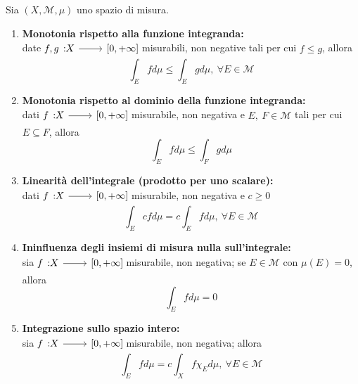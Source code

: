 \begin{property}
	Sia $\left(X,\mathcal{M},\mu\right)$ uno spazio di misura.
	\begin{enumerate}
		\item \textbf{Monotonia rispetto alla funzione integranda:}\\
		date $\funz{f,g}{X}{\left[0,+\infty\right]}$ misurabili, non negative tali per cui $f\leq g$, allora
		\begin{equation}
			\int_E fd\mu\leq \int_E gd\mu,\ \forall E\in\mathcal{M}
		\end{equation}
		\item \textbf{Monotonia rispetto al dominio della funzione integranda:}\\
		dati $\funz{f}{X}{\left[0,+\infty\right]}$ misurabile, non negativa e $E,\ F\in\mathcal{M}$ tali per cui $E\subseteq F$, allora
		\begin{equation}
			\int_Efd\mu\leq \int_Fgd\mu
		\end{equation}
		\item \textbf{Linearità dell'integrale (prodotto per uno scalare):}\\
		dati $\funz{f}{X}{\left[0,+\infty\right]}$ misurabile, non negativa e $c\geq 0$
		\begin{equation}
			\int_E cfd\mu=c\int_Efd\mu,\ \forall E\in\mathcal{M}
		\end{equation}
		\item \textbf{Ininfluenza degli insiemi di misura nulla sull'integrale:}\\
		sia $\funz{f}{X}{\left[0,+\infty\right]}$ misurabile, non negativa; se $E\in\mathcal{M}$ con $\mu\left(E\right)=0$, allora
		\begin{equation}
			\int_Efd\mu=0
		\end{equation}
		\item \textbf{Integrazione sullo spazio intero:}\\
		sia $\funz{f}{X}{\left[0,+\infty\right]}$ misurabile, non negativa; allora
		\begin{equation}
			\int_E fd\mu=c\int_Xf\chi_Ed\mu,\ \forall E\in\mathcal{M}
		\end{equation}
	\end{enumerate}
\end{property}
